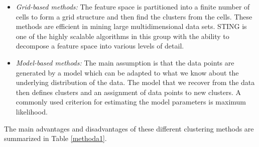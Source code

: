 \begin{itemize}
    
    \item\textit{Grid-based methods:} %
    The feature space is partitioned into a finite number of cells to form a grid structure and then find the clusters from the cells. These methods are efficient in mining large multidimensional data sets. STING is one of the highly scalable algorithms in this group with the ability to decompose a feature space into various levels of detail. 
   
    \item\textit{Model-based methods:} The main assumption is that the data points are generated by a model which can be adapted to what we know about the underlying distribution of the data. The model that we recover from the data then defines clusters and an assignment of data points to new clusters. A commonly used criterion for estimating the model parameters is maximum likelihood.
    
\end{itemize}

The main advantages and disadvantages of these different clustering methods are summarized in Table \ref{methoda1}. 


